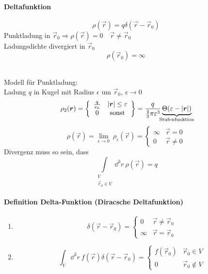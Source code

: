 \begin{minipage}{.6\linewidth}
	\paragraph{Deltafunktion}
	
	$$\rho (\vec{r}) = q \delta(\vec{r}-\vec{r}_0)$$
	Punktladung in $\vec{r}_0 \Rightarrow \rho(\vec{r}) = 0 \quad \vec{r} \neq \vec{r}_0$\\
	Ladungsdichte divergiert in $\vec{r}_0$
	$$\rho(\vec{r}_0) = \infty$$
\end{minipage}%
\begin{minipage}{.4\linewidth}
	\centering
\end{minipage}%
\\
Modell für Punktladung:\\
Ladung $q$ in Kugel mit Radius $\epsilon$  um $\vec{r}_0,\ \epsilon \rightarrow 0$
$$\rho_2 (\vec{r}) = \left\{ \begin{array}{cc}
\frac{q}{v_k} & |\vec{r}| \leq \epsilon\\
0 & \textrm{sonst}	
\end{array} \right\} = \frac{q}{\frac{4}{3}\pi \epsilon^3}\underbrace{\Theta (\epsilon - |\vec{r}|)}_{\mathclap{\textrm{Stufenfunktion}}}$$
%
%
%
%
%
%
$$\rho(\vec{r}) = \lim_{\epsilon \rightarrow 0}\ \rho_\epsilon (\vec{r}) = \left\{ \begin{array}{cc}
\infty & \vec{r} = 0\\
0 & \vec{r} \neq 0
\end{array}\right.$$
Divergenz muss so sein, dass $$ \int\limits_{\substack{V \\ \vec{r}_0 \in V}} \dd^3r\ \rho(\vec{r}) = q$$

\paragraph{Definition Delta-Funktion (Diracsche Deltafunktion)}

\begin{enumerate}
	\item 
	$$\delta (\vec{r} - \vec{r}_0) = \left\{ \begin{array}{cc}
		0 & \vec{r} \neq \vec{r}_0 \\
		\infty & \vec{r} = \vec{r}_0
	\end{array}\right.$$
	\item 
	$$\int_V \dd^3 r\ f(\vec{r}) \delta(\vec{r} - \vec{r}_0) = \left\{ \begin{array}{cc}
		f(\vec{r}_0) & \vec{r}_0 \in V\\
		0 & \vec{r}_0 \notin V
	\end{array}\right.$$ 
\end{enumerate}

